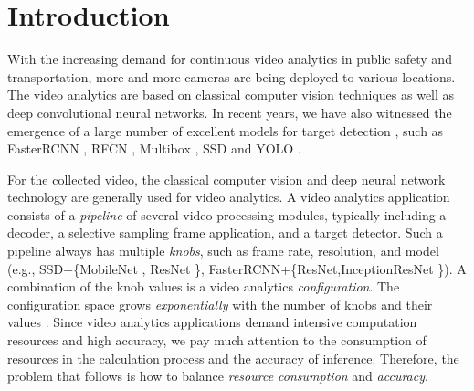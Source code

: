 \section{Introduction}
\label{Section: introduction}
With the increasing demand for continuous video analytics in public safety and transportation, more and more cameras are being deployed to various locations. The video analytics are based on classical computer vision techniques as well as deep convolutional neural networks. In recent years, we have also witnessed the emergence of a large number of excellent models for target detection \cite{huang2017speed_accuracy}, such as FasterRCNN \cite{ren2015faster_rcnn}, RFCN \cite{dai2016r_fcn}, Multibox \cite{szegedy2014multibox}, SSD \cite{liu2016ssd} and YOLO \cite{redmon2016yolo}.

For the collected video, the classical computer vision and deep neural network technology are generally used for video analytics. A video analytics application consists of a \emph{pipeline} of several video processing modules, typically including a decoder, a selective sampling frame application, and a target detector. Such a pipeline always has multiple \emph{knobs}, such as frame rate, resolution, and model (e.g., SSD+\{MobileNet \cite{howard2017mobilenets}, ResNet \cite{he2016resnet}\}, FasterRCNN+\{ResNet,InceptionResNet \cite{szegedy2016inception}\}). A combination of the knob values is a video analytics \emph{configuration}. The configuration space grows \emph{exponentially} with the number of knobs and their values \cite{jiang2018chameleon}. Since video analytics applications demand intensive computation resources and high accuracy, we pay much attention to the consumption of resources in the calculation process and the accuracy of inference. Therefore, the problem that follows is how to balance \emph{resource consumption} and \emph{accuracy}. 

